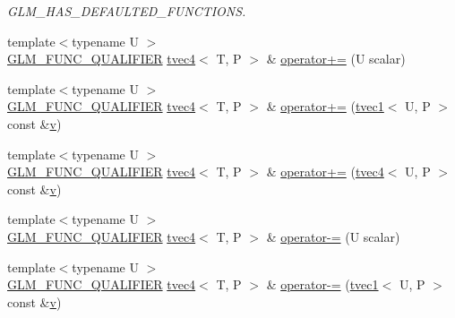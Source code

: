 \begin{DoxyCompactItemize}
\begin{DoxyCompactList}\small\item\em G\+L\+M\+\_\+\+H\+A\+S\+\_\+\+D\+E\+F\+A\+U\+L\+T\+E\+D\+\_\+\+F\+U\+N\+C\+T\+I\+O\+NS. \end{DoxyCompactList}\item 
{\footnotesize template$<$typename U $>$ }\\\mbox{\hyperlink{setup_8hpp_a33fdea6f91c5f834105f7415e2a64407}{G\+L\+M\+\_\+\+F\+U\+N\+C\+\_\+\+Q\+U\+A\+L\+I\+F\+I\+ER}} \mbox{\hyperlink{structglm_1_1tvec4}{tvec4}}$<$ T, P $>$ \& \mbox{\hyperlink{structglm_1_1tvec4_ab912e863aaeed2404176cd748aa42b67}{operator+=}} (U scalar)
\item 
{\footnotesize template$<$typename U $>$ }\\\mbox{\hyperlink{setup_8hpp_a33fdea6f91c5f834105f7415e2a64407}{G\+L\+M\+\_\+\+F\+U\+N\+C\+\_\+\+Q\+U\+A\+L\+I\+F\+I\+ER}} \mbox{\hyperlink{structglm_1_1tvec4}{tvec4}}$<$ T, P $>$ \& \mbox{\hyperlink{structglm_1_1tvec4_ac96caa0894b30459db5b4878c145977f}{operator+=}} (\mbox{\hyperlink{structglm_1_1tvec1}{tvec1}}$<$ U, P $>$ const \&\mbox{\hyperlink{glad_8h_a14cfbe2fc2234f5504618905b69d1e06}{v}})
\item 
{\footnotesize template$<$typename U $>$ }\\\mbox{\hyperlink{setup_8hpp_a33fdea6f91c5f834105f7415e2a64407}{G\+L\+M\+\_\+\+F\+U\+N\+C\+\_\+\+Q\+U\+A\+L\+I\+F\+I\+ER}} \mbox{\hyperlink{structglm_1_1tvec4}{tvec4}}$<$ T, P $>$ \& \mbox{\hyperlink{structglm_1_1tvec4_a7f4b03466df6bcba831d4cfac6df8405}{operator+=}} (\mbox{\hyperlink{structglm_1_1tvec4}{tvec4}}$<$ U, P $>$ const \&\mbox{\hyperlink{glad_8h_a14cfbe2fc2234f5504618905b69d1e06}{v}})
\item 
{\footnotesize template$<$typename U $>$ }\\\mbox{\hyperlink{setup_8hpp_a33fdea6f91c5f834105f7415e2a64407}{G\+L\+M\+\_\+\+F\+U\+N\+C\+\_\+\+Q\+U\+A\+L\+I\+F\+I\+ER}} \mbox{\hyperlink{structglm_1_1tvec4}{tvec4}}$<$ T, P $>$ \& \mbox{\hyperlink{structglm_1_1tvec4_aa293b1a9e9bfc9d9a3700a821a39cc23}{operator-\/=}} (U scalar)
\item 
{\footnotesize template$<$typename U $>$ }\\\mbox{\hyperlink{setup_8hpp_a33fdea6f91c5f834105f7415e2a64407}{G\+L\+M\+\_\+\+F\+U\+N\+C\+\_\+\+Q\+U\+A\+L\+I\+F\+I\+ER}} \mbox{\hyperlink{structglm_1_1tvec4}{tvec4}}$<$ T, P $>$ \& \mbox{\hyperlink{structglm_1_1tvec4_a1cb06bb90bd33c7cf2c8a2a97484af56}{operator-\/=}} (\mbox{\hyperlink{structglm_1_1tvec1}{tvec1}}$<$ U, P $>$ const \&\mbox{\hyperlink{glad_8h_a14cfbe2fc2234f5504618905b69d1e06}{v}})

\end{DoxyCompactItemize}
